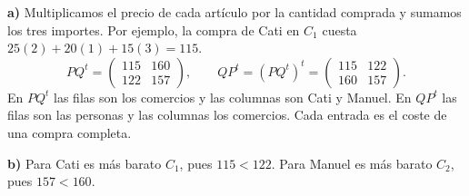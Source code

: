 \textbf{a)} Multiplicamos el precio de cada artículo por la
cantidad comprada y sumamos los tres importes. Por ejemplo,
la compra de Cati en $C_1$ cuesta $25(2)+20(1)+15(3)=115$.
\[
PQ^t=\begin{pmatrix}115&160\\122&157\end{pmatrix},\qquad
QP^t=(PQ^t)^t=\begin{pmatrix}115&122\\160&157\end{pmatrix}.
\]
En $PQ^t$ las filas son los comercios y las columnas son Cati
y Manuel. En $QP^t$ las filas son las personas y las columnas
los comercios. Cada entrada es el coste de una compra completa.

\textbf{b)} Para Cati es más barato $C_1$, pues $115<122$.
Para Manuel es más barato $C_2$, pues $157<160$.
